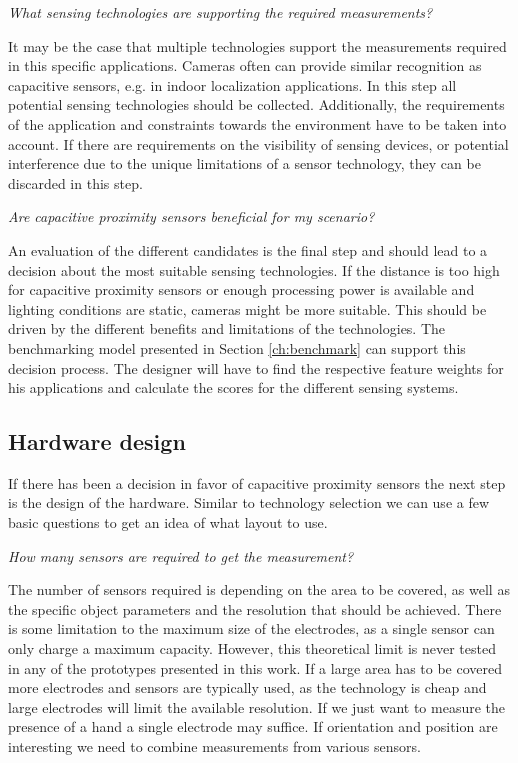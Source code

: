 \textit{What sensing technologies are supporting the required measurements?}

It may be the case that multiple technologies support the measurements required in this specific applications. Cameras often can provide similar recognition as capacitive sensors, e.g. in indoor localization applications. In this step all potential sensing technologies should be collected. Additionally, the requirements of the application and constraints towards the environment have to be taken into account. If there are requirements on the visibility of sensing devices, or potential interference due to the unique limitations of a sensor technology, they can be discarded in this step.

\textit{Are capacitive proximity sensors beneficial for my scenario?}

An evaluation of the different candidates is the final step and should lead to a decision about the most suitable sensing technologies. If the distance is too high for capacitive proximity sensors or enough processing power is available and lighting conditions are static, cameras might be more suitable. This should be driven by the different benefits and limitations of the technologies. The benchmarking model presented in Section \ref{ch:benchmark} can support this decision process. The designer will have to find the respective feature weights for his applications and calculate the scores for the different sensing systems.

\subsection{Hardware design}
If there has been a decision in favor of capacitive proximity sensors the next step is the design of the hardware.  Similar to technology selection we can use a few basic questions to get an idea of what layout to use.

\textit{How many sensors are required to get the measurement?}

The number of sensors required is depending on the area to be covered, as well as the specific object parameters and the resolution that should be achieved. There is some limitation to the maximum size of the electrodes, as a single sensor can only charge a maximum capacity. However, this theoretical limit is never tested in any of the prototypes presented in this work. If a large area has to be covered more electrodes and sensors are typically used, as the technology is cheap and large electrodes will limit the available resolution. If we just want to measure the presence of a hand a single electrode may suffice. If orientation and position are interesting we need to combine measurements from various sensors. 

